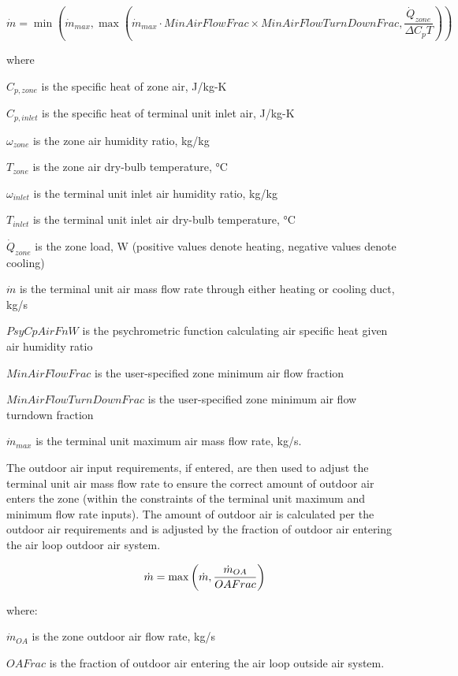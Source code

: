 \begin{equation}
\dot m = \min \left( \dot m_{max}, \max \left( \dot m_{max}\cdot MinAirFlowFrac\times MinAirFlowTurnDownFrac,\frac{\dot Q_{zone}}{\Delta C_p T} \right) \right)
\end{equation}

where

\(C_{p,zone}\) is the specific heat of zone air, J/kg-K

\(C_{p,inlet}\) is the specific heat of terminal unit inlet air, J/kg-K

\({\omega_{zone}}\) is the zone air humidity ratio, kg/kg

\({T_{zone}}\) is the zone air dry-bulb temperature, °C

\({\omega_{inlet}}\) is the terminal unit inlet air humidity ratio, kg/kg

\({T_{inlet}}\) is the terminal unit inlet air dry-bulb temperature, °C

\(\dot Q_{zone}\) is the zone load, W (positive values denote heating, negative values denote cooling)

\(\dot m\) is the terminal unit air mass flow rate through either heating or cooling duct, kg/s

\(PsyCpAirFnW\) is the psychrometric function calculating air specific heat given air humidity ratio

\(MinAirFlowFrac\) is the user-specified zone minimum air flow fraction

\(MinAirFlowTurnDownFrac\) is the user-specified zone minimum air flow turndown fraction

\({\dot m_{max}}\) is the terminal unit maximum air mass flow rate, kg/s.

The outdoor air input requirements, if entered, are then used to adjust the terminal unit air mass flow rate to ensure the correct amount of outdoor air enters the zone (within the constraints of the terminal unit maximum and minimum flow rate inputs). The amount of outdoor air is calculated per the outdoor air requirements and is adjusted by the fraction of outdoor air entering the air loop outdoor air system.

\begin{equation}
  \dot{m} = \max\left( \dot{m}, \frac{\dot{m}_{OA}}{OAFrac} \right)
\end{equation}

where:

\(\dot m_{OA}\) is the zone outdoor air flow rate, kg/s

\(OAFrac\) is the fraction of outdoor air entering the air loop outside air system.

